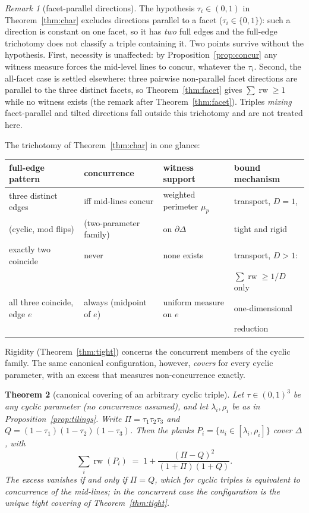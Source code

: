 \documentclass{aims}
\numberwithin{equation}{section}
\theoremstyle{plain}
\newtheorem{theorem}{Theorem}[section]
\theoremstyle{definition}
\theoremstyle{remark}
\newtheorem{remark}[theorem]{Remark}
\newcommand{\rw}{\operatorname{rw}}
\begin{document}
\begin{remark}[facet-parallel directions]\label{rem:facetparallel}
The hypothesis $\tau_i\in(0,1)$ in Theorem~\ref{thm:char} excludes directions
parallel to a facet ($\tau_i\in\{0,1\}$): such a direction is constant on one
facet, so it has \emph{two} full edges and the full-edge trichotomy does not
classify a triple containing it. Two points survive without the hypothesis.
First, necessity is unaffected: by Proposition~\ref{prop:concur} any witness
measure forces the mid-level lines to concur, whatever the $\tau_i$. Second, the
all-facet case is settled elsewhere: three pairwise non-parallel facet directions
are parallel to the three distinct facets, so Theorem~\ref{thm:facet} gives
$\sum\rw\ge1$ while no witness exists (the remark after
Theorem~\ref{thm:facet}). Triples \emph{mixing} facet-parallel and tilted
directions fall outside this trichotomy and are not treated here.
\end{remark}

The trichotomy of Theorem~\ref{thm:char} in one glance:

\begin{center}
\begin{tabular}{@{}llll@{}}
\hline
full-edge pattern & concurrence & witness support & bound mechanism\\
\hline
three distinct edges & iff mid-lines concur & weighted perimeter $\mu_p$
 & transport, $D=1$,\\
(cyclic, mod flips) & (two-parameter family) & on $\partial\Delta$
 & tight and rigid\\[2pt]
exactly two coincide & never & none exists & transport, $D>1$:\\
 & & & $\sum\rw\ge1/D$ only\\[2pt]
all three coincide, edge $e$ & always (midpoint of $e$) & uniform measure
on $e$ & one-dimensional\\
 & & & reduction\\
\hline
\end{tabular}
\end{center}

Rigidity (Theorem~\ref{thm:tight}) concerns the concurrent members of the
cyclic family. The same canonical configuration, however, \emph{covers} for
every cyclic parameter, with an excess that measures non-concurrence exactly.

\begin{theorem}[canonical covering of an arbitrary cyclic triple]
\label{thm:canon}
Let $\tau\in(0,1)^3$ be any cyclic parameter (no concurrence assumed), and
let $\lambda_i,\rho_i$ be as in Proposition~\ref{prop:tilings}. Write
$\Pi=\tau_1\tau_2\tau_3$ and $Q=(1-\tau_1)(1-\tau_2)(1-\tau_3)$. Then the
planks $P_i=\{u_i\in[\lambda_i,\rho_i]\}$ cover $\Delta$, with
\[
\sum_i\rw(P_i)\;=\;1+\frac{(\Pi-Q)^2}{(1+\Pi)(1+Q)} .
\]
The excess vanishes if and only if $\Pi=Q$, which for cyclic triples is
equivalent to concurrence of the mid-lines; in the concurrent case the
configuration is the unique tight covering of Theorem~\ref{thm:tight}.
\end{theorem}
\end{document}
